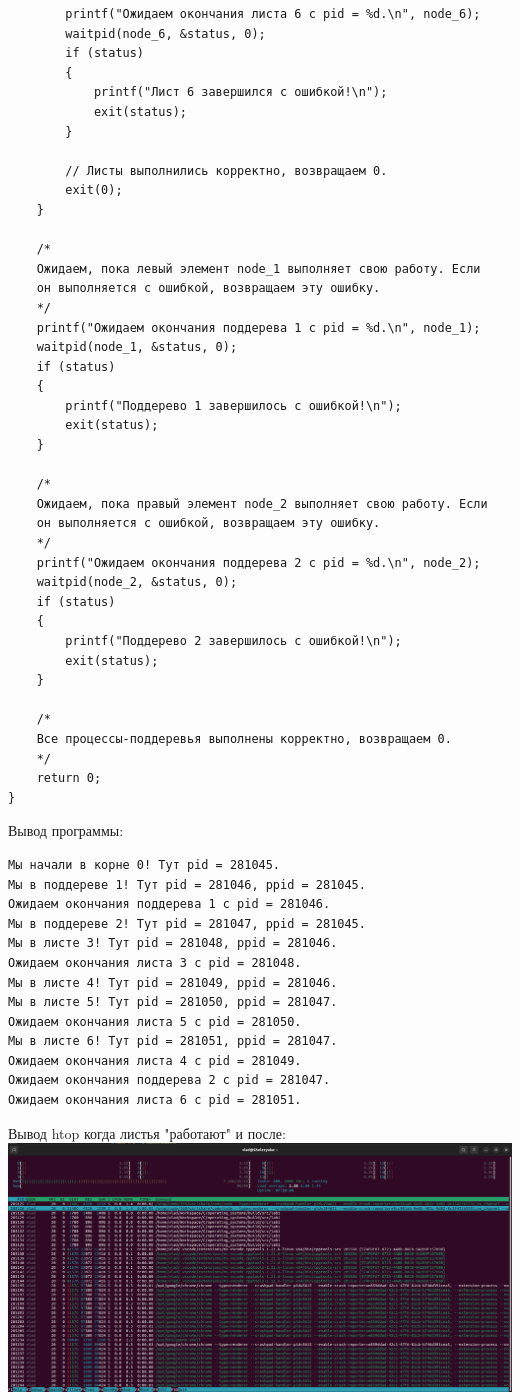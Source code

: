 \documentclass[a4paper,14pt]{extarticle}
\begin{document}
\begin{verbatim}
        printf("Ожидаем окончания листа 6 с pid = %d.\n", node_6);
        waitpid(node_6, &status, 0);
        if (status)
        {
            printf("Лист 6 завершился с ошибкой!\n");
            exit(status);
        }

        // Листы выполнились корректно, возвращаем 0.
        exit(0);
    }

    /*
    Ожидаем, пока левый элемент node_1 выполняет свою работу. Если
    он выполняется с ошибкой, возвращаем эту ошибку.
    */
    printf("Ожидаем окончания поддерева 1 с pid = %d.\n", node_1);
    waitpid(node_1, &status, 0);
    if (status)
    {
        printf("Поддерево 1 завершилось с ошибкой!\n");
        exit(status);
    }

    /*
    Ожидаем, пока правый элемент node_2 выполняет свою работу. Если
    он выполняется с ошибкой, возвращаем эту ошибку.
    */
    printf("Ожидаем окончания поддерева 2 с pid = %d.\n", node_2);
    waitpid(node_2, &status, 0);
    if (status)
    {
        printf("Поддерево 2 завершилось с ошибкой!\n");
        exit(status);
    }

    /*
    Все процессы-поддеревья выполнены корректно, возвращаем 0.
    */
    return 0;
}
\end{verbatim}
Вывод программы:\\
\begin{verbatim}
Мы начали в корне 0! Тут pid = 281045.
Мы в поддереве 1! Тут pid = 281046, ppid = 281045.
Ожидаем окончания поддерева 1 с pid = 281046.
Мы в поддереве 2! Тут pid = 281047, ppid = 281045.
Мы в листе 3! Тут pid = 281048, ppid = 281046.
Ожидаем окончания листа 3 с pid = 281048.
Мы в листе 4! Тут pid = 281049, ppid = 281046.
Мы в листе 5! Тут pid = 281050, ppid = 281047.
Ожидаем окончания листа 5 с pid = 281050.
Мы в листе 6! Тут pid = 281051, ppid = 281047.
Ожидаем окончания листа 4 с pid = 281049.
Ожидаем окончания поддерева 2 с pid = 281047.
Ожидаем окончания листа 6 с pid = 281051.
\end{verbatim}
Вывод htop когда листья "работают" и после:\\
\includegraphics[width=140mm]{main_htop_before}\\
\end{document}
